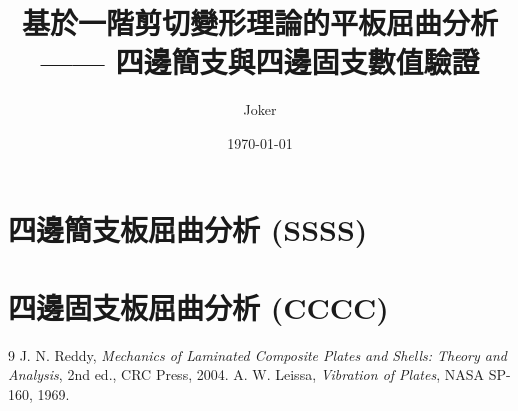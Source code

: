 \documentclass[12pt,a4paper]{report}
\title{基於一階剪切變形理論的平板屈曲分析\\ —— 四邊簡支與四邊固支數值驗證}
\author{Joker}
\date{\today}
\begin{document}
\maketitle
\tableofcontents

\chapter{四邊簡支板屈曲分析 (SSSS)}
\label{chap:ssss}


\chapter{四邊固支板屈曲分析 (CCCC)}
\label{chap:cccc}


\begin{thebibliography}{9}
J. N. Reddy, \emph{Mechanics of Laminated Composite Plates and Shells: Theory and Analysis}, 2nd ed., CRC Press, 2004.
A. W. Leissa, \emph{Vibration of Plates}, NASA SP-160, 1969.
\end{thebibliography}
\end{document}
